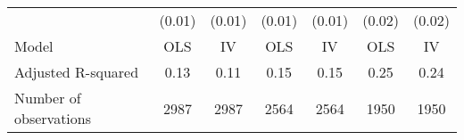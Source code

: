 \begin{tabular}{lllllll}
\multicolumn{1}{l}{} &
  \multicolumn{1}{c}{(0.01)} &
  \multicolumn{1}{c}{(0.01)} &
  \multicolumn{1}{c}{(0.01)} &
  \multicolumn{1}{c}{(0.01)} &
  \multicolumn{1}{c}{(0.02)} &
  \multicolumn{1}{c}{(0.02)} \\
\multicolumn{1}{l}{Model} &
  \multicolumn{1}{c}{OLS} &
  \multicolumn{1}{c}{IV} &
  \multicolumn{1}{c}{OLS} &
  \multicolumn{1}{c}{IV} &
  \multicolumn{1}{c}{OLS} &
  \multicolumn{1}{c}{IV} \\
\multicolumn{1}{l}{Adjusted R-squared} &
  \multicolumn{1}{c}{0.13} &
  \multicolumn{1}{c}{0.11} &
  \multicolumn{1}{c}{0.15} &
  \multicolumn{1}{c}{0.15} &
  \multicolumn{1}{c}{0.25} &
  \multicolumn{1}{c}{0.24} \\
\multicolumn{1}{l}{Number of observations} &
  \multicolumn{1}{c}{2987} &
  \multicolumn{1}{c}{2987} &
  \multicolumn{1}{c}{2564} &
  \multicolumn{1}{c}{2564} &
  \multicolumn{1}{c}{1950} &
  \multicolumn{1}{c}{1950} \\
\cline{1-7}
\end{tabular}
